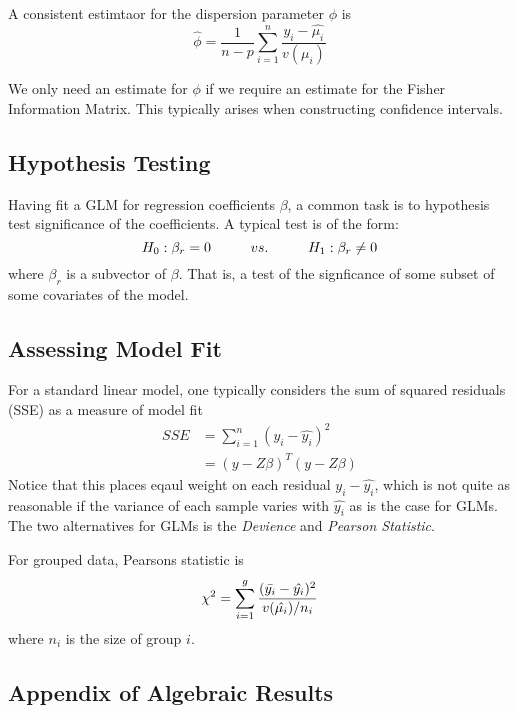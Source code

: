 \begin{lemma}
    A consistent estimtaor for the dispersion parameter $\phi$ is 
    $$\hat{\phi} = \frac{1}{n-p}\sum_{i=1}^{n}\frac{y_i - \hat{\mu_i}}{v(\mu_i)}$$
\end{lemma}
\begin{note}
    We only need an estimate for $\phi$ if we require an estimate for the Fisher Information Matrix. This typically arises when constructing confidence intervals.
\end{note}

\subsection{Hypothesis Testing}
Having fit a GLM for regression coefficients $\beta$, a common task is to hypothesis test significance of the coefficients. A typical test is of the form: 
$$H_0: \beta_r = 0 \hspace{10mm} vs. \hspace{10mm} H_1: \beta_r \neq 0$$
where $\beta_r$ is a subvector of $\beta$. That is, a test of the signficance of some subset of some covariates of the model.

\subsection{Assessing Model Fit}
For a standard linear model, one typically considers the sum of squared residuals (SSE) as a measure of model fit
\begin{align*}
    SSE &= \sum_{i=1}^{n}(y_i - \hat{y_i})^2 \\
    &= (y - Z\beta)^T(y-Z\beta)
\end{align*}
Notice that this places eqaul weight on each residual $y_i - 
\hat{y_i}$, which is not quite as reasonable if the variance of each sample varies with $\hat{y_i}$ as is the case for GLMs. The two alternatives for GLMs is the \textit{Devience} and \textit{Pearson Statistic}.

\begin{definition}
    For grouped data, Pearsons statistic is 
    $$\chi^2 = \sum_{i=1}^{g}\frac{(\Bar{y_i} - \hat{y_i})^2}{v(\hat{\mu_i})/n_i}$$
    where $n_i$ is the size of group $i$.
\end{definition}

\subsection{Appendix of Algebraic Results}
